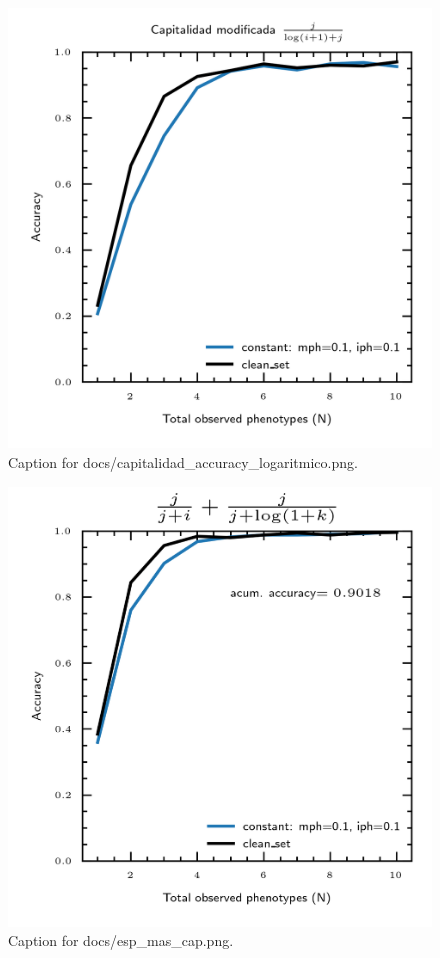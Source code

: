 \documentclass{article}
\begin{document}
\begin{figure}[h] \centering \includegraphics{docs/capitalidad_accuracy_logaritmico.png} \caption{Caption for docs/capitalidad_accuracy_logaritmico.png.} \end{figure}
\begin{figure}[h] \centering \includegraphics{docs/esp_mas_cap.png} \caption{Caption for docs/esp_mas_cap.png.} \end{figure}
\end{document}
